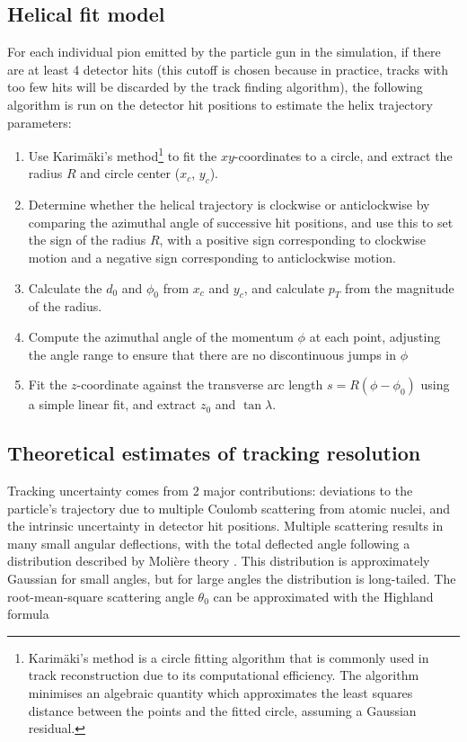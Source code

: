 \documentclass[titlepage]{article}[11pt]
\begin{document}
\subsection{Helical fit model} \label{Helical fit model}
For each individual pion emitted by the particle gun in the simulation, if there are at least 4 detector hits (this cutoff is chosen because in practice, tracks with too few hits will be discarded by the track finding algorithm), the following algorithm is run on the detector hit positions to estimate the helix trajectory parameters:

\begin{enumerate}
	\item Use Karimäki's method\footnote[6]{
		 Karimäki's method\cite{Karimaki:1990zz} is a circle fitting algorithm that is commonly used in track reconstruction due to its computational efficiency. The algorithm minimises an algebraic quantity which approximates the least squares distance between the points and the fitted circle, assuming a Gaussian residual.
	} to fit the $xy$-coordinates to a circle, and extract the radius $R$ and circle center ($x_c$, $y_c$).
	\item Determine whether the helical trajectory is clockwise or anticlockwise by comparing the azimuthal angle of successive hit positions, and use this to set the sign of the radius $R$, with a positive sign corresponding to clockwise motion and a negative sign corresponding to anticlockwise motion.
	\item Calculate the $d_0$ and $\phi_0$ from $x_c$ and $y_c$, and calculate $p_T$ from the magnitude of the radius.
	\item Compute the azimuthal angle of the momentum $\phi$ at each point, adjusting the angle range to ensure that there are no discontinuous jumps in $\phi$
	\item Fit the $z$-coordinate against the transverse arc length $s=R(\phi - \phi_0)$ using a simple linear fit, and extract $z_0$ and $\tan \lambda$.
\end{enumerate}

\subsection{Theoretical estimates of tracking resolution} \label{Theoretical estimates of tracking resolution}
Tracking uncertainty comes from 2 major contributions: deviations to the particle's trajectory due to multiple Coulomb scattering from atomic nuclei, and the intrinsic uncertainty in detector hit positions. Multiple scattering results in many small angular deflections, with the total deflected angle following a distribution described by Molière theory \cite{Leo1987} \cite{PhysRev.89.1256}. This distribution is approximately Gaussian for small angles, but for large angles the distribution is long-tailed. The root-mean-square scattering angle $\theta_0$ can be approximated with the Highland formula \cite{HIGHLAND1975497} \cite{Lynch:1990sq}
\end{document}
